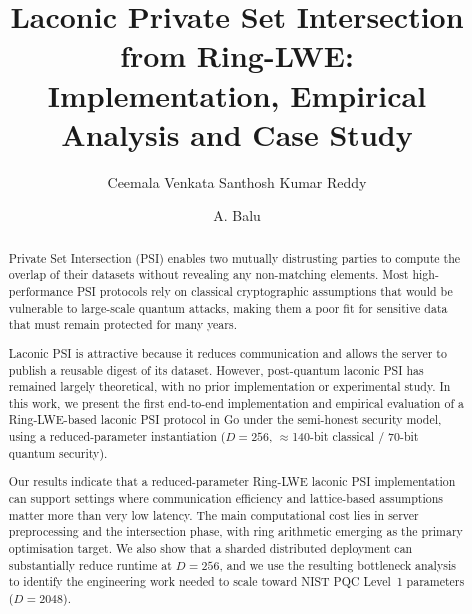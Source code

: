 \documentclass[preprint,12pt]{elsarticle}
\def\corref#1{}%
\begin{document}
\begin{frontmatter}

\title{Laconic Private Set Intersection from Ring-LWE:\\ Implementation, Empirical Analysis and Case Study}

\author[iiitk]{Ceemala Venkata Santhosh Kumar Reddy\corref{cor1}}

\author[iiitk]{A. Balu}


\begin{abstract}
Private Set Intersection (PSI) enables two mutually distrusting parties to
compute the overlap of their datasets without revealing any non-matching
elements. Most high-performance PSI protocols rely on classical cryptographic
assumptions that would be vulnerable to large-scale quantum attacks, making
them a poor fit for sensitive data that must remain protected for many years.

Laconic PSI is attractive because it reduces communication and allows the
server to publish a reusable digest of its dataset. However, post-quantum
laconic PSI has remained largely theoretical, with no prior implementation or
experimental study. In this work, we present the first end-to-end
implementation and empirical evaluation of a Ring-LWE-based laconic PSI
protocol in Go under the semi-honest security model, using a
reduced-parameter instantiation ($D=256$, $\approx$140-bit classical /
70-bit quantum security).

Our results indicate that a reduced-parameter Ring-LWE laconic PSI implementation can support settings
where communication efficiency and lattice-based assumptions matter more than
very low latency. The main computational cost lies in server preprocessing
and the intersection phase, with ring arithmetic emerging as the primary
optimisation target. We also show that a sharded distributed deployment can
substantially reduce runtime at $D=256$, and we use the resulting
bottleneck analysis to identify the engineering work needed to scale toward
NIST PQC Level~1 parameters ($D=2048$).


\end{abstract}
\end{frontmatter}
\end{document}
